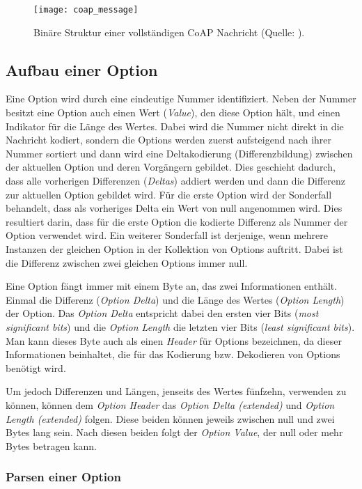 \begin{figure}[h]
    \centering
    \texttt{[image: coap\_message]}
    \caption{Binäre Struktur einer vollständigen CoAP Nachricht (Quelle: \autocite{RFC7252}).}
    \label{fig:binaere-sturktur-einer-vollstaendigen-coap-nachricht}
\end{figure}

\subsection{Aufbau einer Option}
\label{subsec:aufbau-einer-option}

Eine Option wird durch eine eindeutige Nummer identifiziert. Neben der Nummer besitzt eine Option auch einen Wert (\textit{Value}), den diese Option hält, und einen Indikator für die Länge des Wertes. Dabei wird die Nummer nicht direkt in die Nachricht kodiert, sondern die Options werden zuerst aufsteigend nach ihrer Nummer sortiert und dann wird eine Deltakodierung (Differenzbildung) zwischen der aktuellen Option und deren Vorgängern gebildet. Dies geschieht dadurch, dass alle vorherigen Differenzen (\textit{Deltas}) addiert werden und dann die Differenz zur aktuellen Option gebildet wird. Für die erste Option wird der Sonderfall behandelt, dass als vorheriges Delta ein Wert von null angenommen wird. Dies resultiert darin, dass für die erste Option die kodierte Differenz als Nummer der Option verwendet wird. Ein weiterer Sonderfall ist derjenige, wenn mehrere Instanzen der gleichen Option in der Kollektion von Options auftritt. Dabei ist die Differenz zwischen zwei gleichen Options immer null.

Eine Option fängt immer mit einem Byte an, das zwei Informationen enthält. Einmal die Differenz (\textit{Option Delta}) und die Länge des Wertes (\textit{Option Length}) der Option. Das \textit{Option Delta} entspricht dabei den ersten vier Bits (\textit{most significant bits}) und die \textit{Option Length} die letzten vier Bits (\textit{least significant bits}). Man kann dieses Byte auch als einen \textit{Header} für Options bezeichnen, da dieser Informationen beinhaltet, die für das Kodierung bzw. Dekodieren von Options benötigt wird.

Um jedoch Differenzen und Längen, jenseits des Wertes fünfzehn, verwenden zu können, können dem \textit{Option Header} das \textit{Option Delta (extended)} und \textit{Option Length (extended)} folgen. Diese beiden können jeweils zwischen null und zwei Bytes lang sein. Nach diesen beiden folgt der \textit{Option Value}, der null oder mehr Bytes betragen kann.

\subsubsection{Parsen einer Option}
\label{subsubsec:parsen-einer-option}


